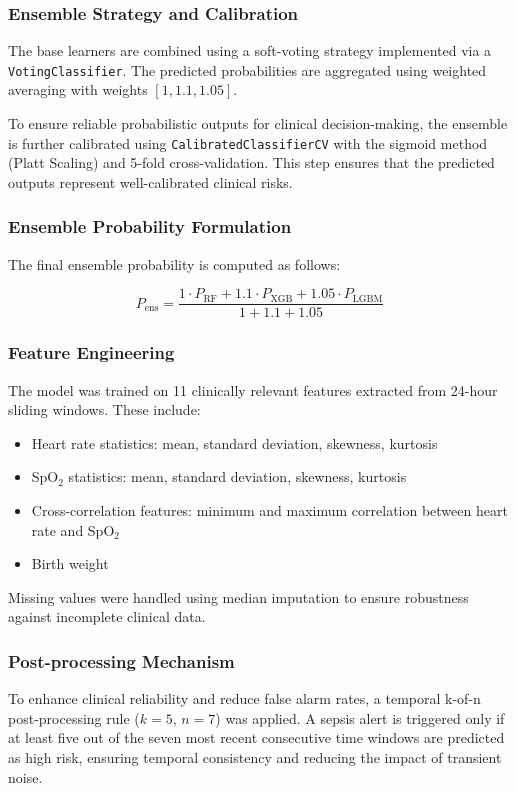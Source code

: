 \documentclass[conference]{IEEEtran}
\begin{document}
\subsubsection{Ensemble Strategy and Calibration}
The base learners are combined using a soft-voting strategy implemented via a \texttt{VotingClassifier}. The predicted probabilities are aggregated using weighted averaging with weights $[1, 1.1, 1.05]$.

To ensure reliable probabilistic outputs for clinical decision-making, the ensemble is further calibrated using \texttt{CalibratedClassifierCV} with the sigmoid method (Platt Scaling) and 5-fold cross-validation. This step ensures that the predicted outputs represent well-calibrated clinical risks.

\subsubsection{Ensemble Probability Formulation}
The final ensemble probability is computed as follows:

\begin{equation}
P_{\text{ens}} = \frac{1 \cdot P_{\text{RF}} + 1.1 \cdot P_{\text{XGB}} + 1.05 \cdot P_{\text{LGBM}}}{1 + 1.1 + 1.05}
\end{equation}

\subsubsection{Feature Engineering}
The model was trained on 11 clinically relevant features extracted from 24-hour sliding windows. These include:

\begin{itemize}
    \item Heart rate statistics: mean, standard deviation, skewness, kurtosis
    \item SpO$_2$ statistics: mean, standard deviation, skewness, kurtosis
    \item Cross-correlation features: minimum and maximum correlation between heart rate and SpO$_2$
    \item Birth weight
\end{itemize}

Missing values were handled using median imputation to ensure robustness against incomplete clinical data.

\subsubsection{Post-processing Mechanism}
To enhance clinical reliability and reduce false alarm rates, a temporal k-of-n post-processing rule ($k = 5$, $n = 7$) was applied. A sepsis alert is triggered only if at least five out of the seven most recent consecutive time windows are predicted as high risk, ensuring temporal consistency and reducing the impact of transient noise.
\end{document}
